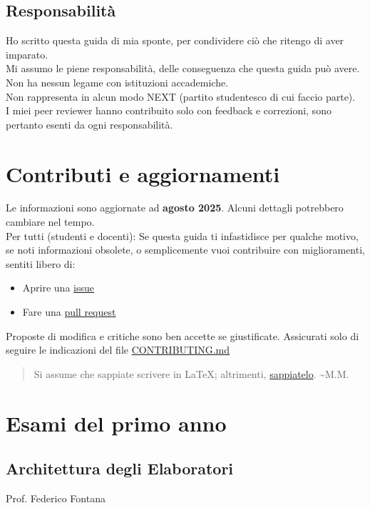 \documentclass[18pt]{extarticle}
\begin{document}
\subsection{Responsabilità}
Ho scritto questa guida di mia sponte, per condividere ciò che ritengo di aver imparato.\\
Mi assumo le piene responsabilità, delle conseguenza che questa guida può avere.\\
Non ha nessun legame con istituzioni accademiche.\\
Non rappresenta in alcun modo NEXT (partito studentesco di cui faccio parte).\\
I miei peer reviewer hanno contribuito solo con feedback e correzioni, sono pertanto esenti da ogni responsabilità.\\

\section{Contributi e aggiornamenti}
Le informazioni sono aggiornate ad \textbf{agosto 2025}. Alcuni dettagli potrebbero cambiare nel tempo.\\
Per tutti (studenti e docenti): Se questa guida ti infastidisce per qualche motivo, se noti informazioni obsolete, o semplicemente vuoi contribuire con miglioramenti, sentiti libero di:
\begin{itemize}
    \item Aprire una \href{https://github.com/Verryx-02/Scuola-di-sopravvivenza-per-studenti-di-Informatica/issues}{issue}
    \item Fare una \href{https://github.com/Verryx-02/Scuola-di-sopravvivenza-per-studenti-di-Informatica/pulls}{pull request}
\end{itemize}
Proposte di modifica e critiche sono ben accette se giustificate. Assicurati solo di seguire le indicazioni del file \href{https://github.com/Verryx-02/Scuola-di-sopravvivenza-per-studenti-di-Informatica/blob/main/CONTRIBUTING.md}{CONTRIBUTING.md}
\begin{quote}
Si assume che sappiate scrivere in \LaTeX; altrimenti, \href{https://www.learnlatex.org/it/}{sappiatelo}. \textasciitilde M.M.
\end{quote}

\clearpage
\section{Esami del primo anno}
\subsection{Architettura degli Elaboratori}
Prof. Federico Fontana
\end{document}
